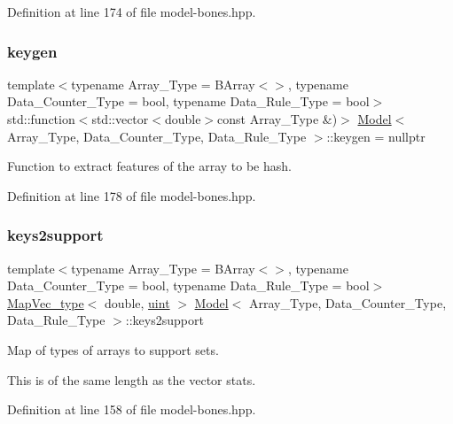 Definition at line 174 of file model-\/bones.\+hpp.

\mbox{\label{class_model_a16561e15c0abbb080927382b30d43e35}} 
\subsubsection{\texorpdfstring{keygen}{keygen}}
{\footnotesize\ttfamily template$<$typename Array\+\_\+\+Type = B\+Array$<$$>$, typename Data\+\_\+\+Counter\+\_\+\+Type = bool, typename Data\+\_\+\+Rule\+\_\+\+Type = bool$>$ \\
std\+::function$<$std\+::vector$<$double$>$const Array\+\_\+\+Type \&)$>$ \hyperlink{class_model}{Model}$<$ Array\+\_\+\+Type, Data\+\_\+\+Counter\+\_\+\+Type, Data\+\_\+\+Rule\+\_\+\+Type $>$\+::keygen = nullptr}



Function to extract features of the array to be hash. 



Definition at line 178 of file model-\/bones.\+hpp.

\mbox{\label{class_model_a2a81190ac618b04479686411d02b3c5f}} 
\subsubsection{\texorpdfstring{keys2support}{keys2support}}
{\footnotesize\ttfamily template$<$typename Array\+\_\+\+Type = B\+Array$<$$>$, typename Data\+\_\+\+Counter\+\_\+\+Type = bool, typename Data\+\_\+\+Rule\+\_\+\+Type = bool$>$ \\
\hyperlink{typedefs_8hpp_a02ed8dec96bc528c8bc3d8cb3c4674a5}{Map\+Vec\+\_\+type}$<$ double, \hyperlink{typedefs_8hpp_a91ad9478d81a7aaf2593e8d9c3d06a14}{uint} $>$ \hyperlink{class_model}{Model}$<$ Array\+\_\+\+Type, Data\+\_\+\+Counter\+\_\+\+Type, Data\+\_\+\+Rule\+\_\+\+Type $>$\+::keys2support}



Map of types of arrays to support sets. 

This is of the same length as the vector {\ttfamily stats}. 

Definition at line 158 of file model-\/bones.\+hpp.

\mbox{\label{class_model_a410caeff58afe605520c878a0689abf5}} 

